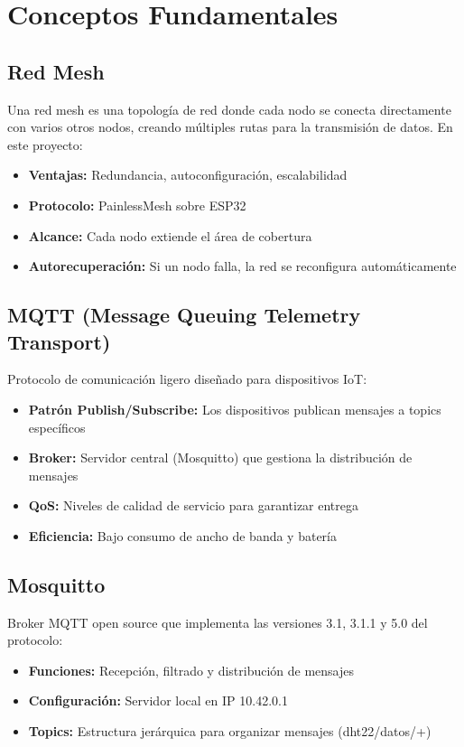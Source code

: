 \documentclass[12pt]{article}
\begin{document}
\section{Conceptos Fundamentales}

\subsection{Red Mesh}
Una red mesh es una topología de red donde cada nodo se conecta directamente con varios otros nodos, creando múltiples rutas para la transmisión de datos. En este proyecto:

\begin{itemize}
    \item \textbf{Ventajas:} Redundancia, autoconfiguración, escalabilidad
    \item \textbf{Protocolo:} PainlessMesh sobre ESP32
    \item \textbf{Alcance:} Cada nodo extiende el área de cobertura
    \item \textbf{Autorecuperación:} Si un nodo falla, la red se reconfigura automáticamente
\end{itemize}

\subsection{MQTT (Message Queuing Telemetry Transport)}
Protocolo de comunicación ligero diseñado para dispositivos IoT:

\begin{itemize}
    \item \textbf{Patrón Publish/Subscribe:} Los dispositivos publican mensajes a topics específicos
    \item \textbf{Broker:} Servidor central (Mosquitto) que gestiona la distribución de mensajes
    \item \textbf{QoS:} Niveles de calidad de servicio para garantizar entrega
    \item \textbf{Eficiencia:} Bajo consumo de ancho de banda y batería
\end{itemize}

\subsection{Mosquitto}
Broker MQTT open source que implementa las versiones 3.1, 3.1.1 y 5.0 del protocolo:

\begin{itemize}
    \item \textbf{Funciones:} Recepción, filtrado y distribución de mensajes
    \item \textbf{Configuración:} Servidor local en IP 10.42.0.1
    \item \textbf{Topics:} Estructura jerárquica para organizar mensajes (dht22/datos/+)
\end{itemize}
\end{document}
